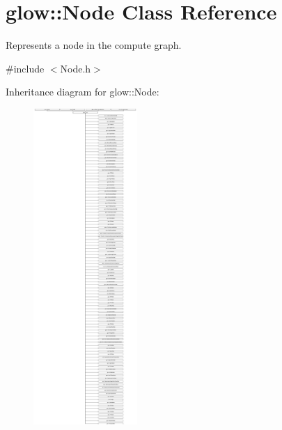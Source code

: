 \hypertarget{classglow_1_1_node}{}\section{glow\+:\+:Node Class Reference}
\label{classglow_1_1_node}


Represents a node in the compute graph.  




{\ttfamily \#include $<$Node.\+h$>$}

Inheritance diagram for glow\+:\+:Node\+:\begin{figure}[H]
\begin{center}
\leavevmode
\includegraphics[height=12.000000cm]{classglow_1_1_node}
\end{center}
\end{figure}
